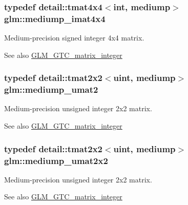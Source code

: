 \subsubsection[{\texorpdfstring{mediump\+\_\+imat4x4}{mediump_imat4x4}}]{\setlength{\rightskip}{0pt plus 5cm}typedef detail\+::tmat4x4$<$int, mediump$>$ {\bf glm\+::mediump\+\_\+imat4x4}}\hypertarget{group__gtc__matrix__integer_gafa2df6be3aad055867b9bfea34e9c4a0}{}\label{group__gtc__matrix__integer_gafa2df6be3aad055867b9bfea34e9c4a0}
Medium-\/precision signed integer 4x4 matrix. \begin{DoxySeeAlso}{See also}
\hyperlink{group__gtc__matrix__integer}{G\+L\+M\+\_\+\+G\+T\+C\+\_\+matrix\+\_\+integer} 
\end{DoxySeeAlso}
\subsubsection[{\texorpdfstring{mediump\+\_\+umat2}{mediump_umat2}}]{\setlength{\rightskip}{0pt plus 5cm}typedef detail\+::tmat2x2$<$uint, mediump$>$ {\bf glm\+::mediump\+\_\+umat2}}\hypertarget{group__gtc__matrix__integer_ga388a5b9d7e494d5f5bd30b9e11ded06a}{}\label{group__gtc__matrix__integer_ga388a5b9d7e494d5f5bd30b9e11ded06a}
Medium-\/precision unsigned integer 2x2 matrix. \begin{DoxySeeAlso}{See also}
\hyperlink{group__gtc__matrix__integer}{G\+L\+M\+\_\+\+G\+T\+C\+\_\+matrix\+\_\+integer} 
\end{DoxySeeAlso}
\subsubsection[{\texorpdfstring{mediump\+\_\+umat2x2}{mediump_umat2x2}}]{\setlength{\rightskip}{0pt plus 5cm}typedef detail\+::tmat2x2$<$uint, mediump$>$ {\bf glm\+::mediump\+\_\+umat2x2}}\hypertarget{group__gtc__matrix__integer_ga80e478f09c6caa16410198ce78fe8a2b}{}\label{group__gtc__matrix__integer_ga80e478f09c6caa16410198ce78fe8a2b}
Medium-\/precision unsigned integer 2x2 matrix. \begin{DoxySeeAlso}{See also}
\hyperlink{group__gtc__matrix__integer}{G\+L\+M\+\_\+\+G\+T\+C\+\_\+matrix\+\_\+integer} 
\end{DoxySeeAlso}
